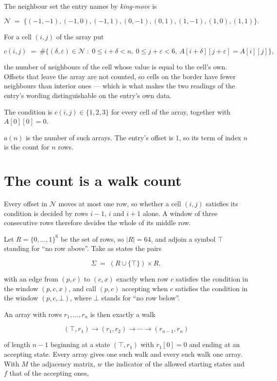 \documentclass[11pt]{article}
\theoremstyle{definition}
\begin{document}
The neighbour set the entry names by {\itshape king-move} is

\[\mathcal{N} \;=\; \{(-1,-1), (-1,0), (-1,1), (0,-1), (0,1), (1,-1), (1,0), (1,1)\}.\]

For a cell $(i,j)$ of the array put

\[c(i,j) \;=\; \#\bigl\{(\delta,\varepsilon)\in\mathcal{N} \;:\; 0\le i+\delta<n,\ 0\le j+\varepsilon<6,\ A[i+\delta][j+\varepsilon] = A[i][j]\bigr\},\]

the number of neighbours of the cell whose value is equal to the cell's own. Offsets that leave the array are not counted, so cells on the border have fewer neighbours than interior ones --- which is what makes the two readings of the entry's wording distinguishable on the entry's own data.

The condition is $c(i,j) \in \{1, 2, 3\}$ for every cell of the array, together with $A[0][0]=0$.

$a(n)$ is the number of such arrays. The entry's offset is 1, so its term of index $n$ is the count for $n$ rows.

\section{The count is a walk count}

Every offset in $\mathcal{N}$ moves at most one row, so whether a cell $(i,j)$ satisfies its condition is decided by rows $i-1$, $i$ and $i+1$ alone. A window of three consecutive rows therefore decides the whole of its middle row.

Let $R = \{0,\dots,1\}^{6}$ be the set of rows, so $|R| = 64$, and adjoin a symbol $\top$ standing for ``no row above''. Take as states the pairs

\[\Sigma \;=\; (R \cup \{\top\}) \times R,\]

with an edge from $(p,c)$ to $(c,x)$ exactly when row $c$ satisfies the condition in the window $(p,c,x)$, and call $(p,c)$ accepting when $c$ satisfies the condition in the window $(p,c,\bot)$, where $\bot$ stands for ``no row below''.

An array with rows $r_1,\dots,r_n$ is then exactly a walk

\[(\top,r_1) \to (r_1,r_2) \to \cdots \to (r_{n-1},r_n)\]

of length $n-1$ beginning at a state $(\top,r_1)$ with $r_1[0]=0$ and ending at an accepting state. Every array gives one such walk and every such walk one array. With $M$ the adjacency matrix, $w$ the indicator of the allowed starting states and $f$ that of the accepting ones,
\end{document}
